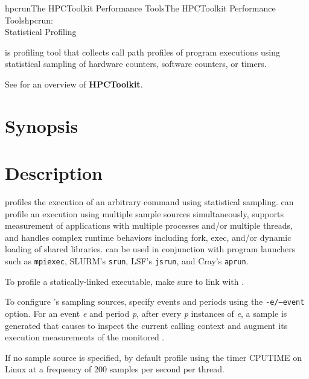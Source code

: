 \documentclass[english]{article}
\begin{document}
\begin{Name}{1}{hpcrun}{The HPCToolkit Performance Tools}{The HPCToolkit Performance Tools}{hpcrun:\\ Statistical Profiling}

 is profiling tool that collects call path profiles of program executions 
using statistical sampling of hardware counters, software counters, or timers.

See  for an overview of \textbf{HPCToolkit}.


\end{Name}

\section{Synopsis}

   

 

\section{Description}

 profiles the execution of an arbitrary command  using statistical sampling.
 can profile an execution using multiple sample sources simultaneously, 
supports measurement of applications with multiple processes and/or multiple threads, and handles complex runtime behaviors including
fork, exec, and/or dynamic loading of shared libraries.
 can be used in conjunction with program launchers such as \texttt{mpiexec}, SLURM's \texttt{srun}, LSF's \texttt{jsrun}, and Cray's \texttt{aprun}.

To profile a statically-linked executable, make sure to link with .

To configure 's sampling sources, specify events and periods using the \texttt{-e/--event} option.
For an event \emph{e} and period \emph{p}, after every \emph{p} instances of \emph{e}, a sample is generated that causes  to inspect the 
current calling context and augment its execution measurements of the monitored .

If no sample source is specified, by default  profile using the timer 
CPUTIME on Linux at a frequency of 200 samples per second per thread. 
\end{document}
